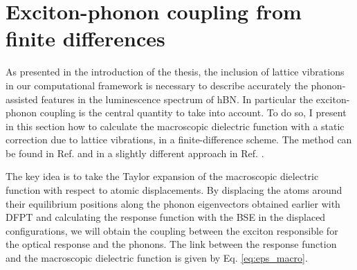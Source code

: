 %
\section{Exciton-phonon coupling from finite differences} \label{sec:excph_fdd}
As presented in the introduction of the thesis, the inclusion of lattice vibrations in our computational framework is necessary to describe accurately the phonon-assisted features in the luminescence spectrum of hBN. In particular the exciton-phonon coupling is the central quantity to take into account. To do so, I present in this section how to calculate the macroscopic dielectric function with a static correction due to lattice vibrations, in a finite-difference scheme. The method can be found in Ref. \cite{paleari2019exciton} and in a slightly different approach in Ref. \cite{cannuccia2019theory}.

The key idea is to take the Taylor expansion of the macroscopic dielectric function with respect to atomic displacements. By displacing the atoms around their equilibrium positions along the phonon eigenvectors obtained earlier with \acrshort{DFPT} and calculating the response function with the \acrshort{BSE} in the displaced configurations, we will obtain the coupling between the exciton responsible for the optical response and the phonons. The link between the response function and the macroscopic dielectric function is given by Eq. \eqref{eq:eps_macro}. 

